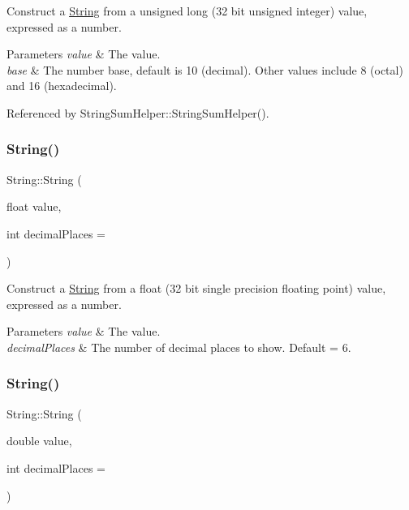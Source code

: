 Construct a \hyperlink{class_string}{String} from a unsigned long (32 bit unsigned integer) value, expressed as a number. 


\begin{DoxyParams}{Parameters}
{\em value} & The value.\\
\hline
{\em base} & The number base, default is 10 (decimal). Other values include 8 (octal) and 16 (hexadecimal). \\
\hline
\end{DoxyParams}


Referenced by String\+Sum\+Helper\+::\+String\+Sum\+Helper().

\mbox{\label{class_string_adef4f199739444a78803c4043ad3e228}} 
\subsubsection{\texorpdfstring{String()}{String()}\hspace{0.1cm}{\footnotesize\ttfamily [12/13]}}
{\footnotesize\ttfamily String\+::\+String (\begin{DoxyParamCaption}\item[{float}]{value,  }\item[{int}]{decimal\+Places = {} }\end{DoxyParamCaption})\hspace{0.3cm}{\ttfamily [explicit]}}



Construct a \hyperlink{class_string}{String} from a float (32 bit single precision floating point) value, expressed as a number. 


\begin{DoxyParams}{Parameters}
{\em value} & The value.\\
\hline
{\em decimal\+Places} & The number of decimal places to show. Default = 6. \\
\hline
\end{DoxyParams}
\mbox{\label{class_string_a46e13b4608fbe763b4fc5bf22362078e}} 
\subsubsection{\texorpdfstring{String()}{String()}\hspace{0.1cm}{\footnotesize\ttfamily [13/13]}}
{\footnotesize\ttfamily String\+::\+String (\begin{DoxyParamCaption}\item[{double}]{value,  }\item[{int}]{decimal\+Places = {} }\end{DoxyParamCaption})\hspace{0.3cm}{\ttfamily [explicit]}}



